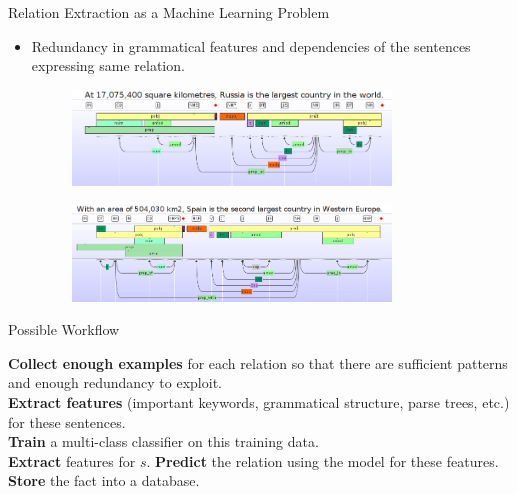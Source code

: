 \documentclass{beamer}
\begin{document}
\begin{frame}{Relation Extraction as a Machine Learning Problem}
 
 \begin{itemize}
  \item Redundancy in grammatical features and dependencies of the sentences expressing same relation. \pause 
     \begin{figure}
    \centering
    \includegraphics[width = 0.8\textwidth]{images/ex_4}
  \end{figure} \pause
  
   \begin{figure}
    \centering
    \includegraphics[width = 0.8\textwidth]{images/ex_5}
  \end{figure}
 \end{itemize}

\end{frame}


\begin{frame}{Possible Workflow} \pause

\begin{algorithmic}[1]
\State \textbf{Collect enough examples} for each relation so that there are sufficient patterns and enough redundancy to exploit. \\
\State \textbf{Extract features} (important keywords, grammatical structure, parse trees, etc.) for these sentences. \\
\State \textbf{Train} a multi-class classifier on this training data. \\
\State \textbf{Extract} features for $s$.
\State \textbf{Predict} the relation using the model for these features.
\State \textbf{Store} the fact into a database.
\EndFor
\end{algorithmic}
\end{frame}
\end{document}

